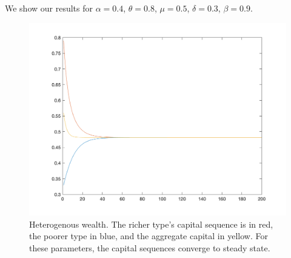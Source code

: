 \documentclass[10pt,letter]{article}
\begin{document}
We show our results for $\alpha = 0.4$, $\theta = 0.8$, $\mu = 0.5$, $\delta=0.3$, $\beta = 0.9$.

\begin{figure}
\includegraphics[scale=0.8]{ps4q3}
\caption{Heterogenous wealth. The richer type's capital sequence is in red, the poorer type in blue, and the aggregate capital in yellow. For these parameters, the capital sequences converge to steady state.}
\end{figure}
\end{document}
